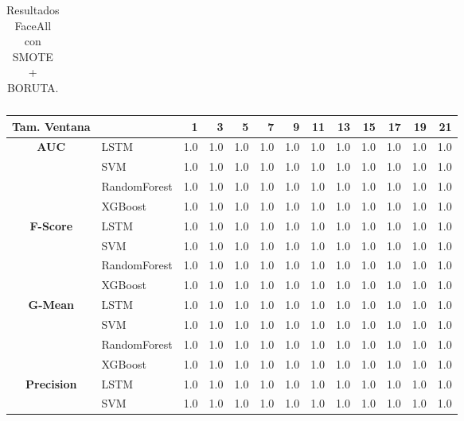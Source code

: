 \begin{table}[h]
\begin{adjustbox}{max width=11cm}
\begin{tabular}{|c|l|r|r|r|r|r|r|r|r|r|r|r|}
		\end{tabular}
	\end{adjustbox}
	\label{tab:faceAllSMOTEBORUTA}
	\caption{Resultados FaceAll con SMOTE + BORUTA.}
\end{table}
\newpage

\begin{table}[h]
	\centering
	\begin{adjustbox}{max width=11cm}
		\begin{tabular}{|c|l|r|r|r|r|r|r|r|r|r|r|r|}
			\hline
			\textbf{Tam. Ventana}&         &   1  &   3  &   5  &   7  &   9  &   11 &   13 &   15 &   17 &   19 &   21 \\
			\hline
			\textbf{AUC} & LSTM &  1.0 &  1.0 &  1.0 &  1.0 &  1.0 &  1.0 &  1.0 &  1.0 &  1.0 &  1.0 &  1.0 \\
			& SVM &  1.0 &  1.0 &  1.0 &  1.0 &  1.0 &  1.0 &  1.0 &  1.0 &  1.0 &  1.0 &  1.0 \\
			& RandomForest &  1.0 &  1.0 &  1.0 &  1.0 &  1.0 &  1.0 &  1.0 &  1.0 &  1.0 &  1.0 &  1.0 \\
			& XGBoost &  1.0 &  1.0 &  1.0 &  1.0 &  1.0 &  1.0 &  1.0 &  1.0 &  1.0 &  1.0 &  1.0 \\
			\hline
			\textbf{F-Score} & LSTM &  1.0 &  1.0 &  1.0 &  1.0 &  1.0 &  1.0 &  1.0 &  1.0 &  1.0 &  1.0 &  1.0 \\
			& SVM &  1.0 &  1.0 &  1.0 &  1.0 &  1.0 &  1.0 &  1.0 &  1.0 &  1.0 &  1.0 &  1.0 \\
			& RandomForest &  1.0 &  1.0 &  1.0 &  1.0 &  1.0 &  1.0 &  1.0 &  1.0 &  1.0 &  1.0 &  1.0 \\
			& XGBoost &  1.0 &  1.0 &  1.0 &  1.0 &  1.0 &  1.0 &  1.0 &  1.0 &  1.0 &  1.0 &  1.0 \\
			\hline
			\textbf{G-Mean} & LSTM &  1.0 &  1.0 &  1.0 &  1.0 &  1.0 &  1.0 &  1.0 &  1.0 &  1.0 &  1.0 &  1.0 \\
			& SVM &  1.0 &  1.0 &  1.0 &  1.0 &  1.0 &  1.0 &  1.0 &  1.0 &  1.0 &  1.0 &  1.0 \\
			& RandomForest &  1.0 &  1.0 &  1.0 &  1.0 &  1.0 &  1.0 &  1.0 &  1.0 &  1.0 &  1.0 &  1.0 \\
			& XGBoost &  1.0 &  1.0 &  1.0 &  1.0 &  1.0 &  1.0 &  1.0 &  1.0 &  1.0 &  1.0 &  1.0 \\
			\hline
			\textbf{Precision} & LSTM &  1.0 &  1.0 &  1.0 &  1.0 &  1.0 &  1.0 &  1.0 &  1.0 &  1.0 &  1.0 &  1.0 \\
			& SVM &  1.0 &  1.0 &  1.0 &  1.0 &  1.0 &  1.0 &  1.0 &  1.0 &  1.0 &  1.0 &  1.0 \\

\end{tabular}
\end{adjustbox}
\end{table}
